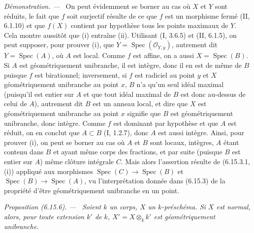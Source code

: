 \documentclass[10pt,oneside]{book}
\newcommand{\oldpage}[2][]{%
  \setcounter{footnote}{0}%
  \marginpar{\scriptsize\textbf{#1}~|~#2}\ignorespaces}
\newenvironment{proposition}[1][]{%
  \par\medskip\noindent\itshape Proposition (#1). ---\ }{\par}
\newenvironment{proof}{%
  \par\medskip\noindent\textit{Démonstration. ---\ }}{\par}
\begin{document}
\begin{proof}
On peut évidemment se borner au cas où $X$ et $Y$ sont réduits, le fait
que $f$ soit surjectif résulte de ce que $f$ est un morphisme fermé (II,
6.1.10) et que $f(X)$ contient par hypothèse tous les points maximaux de
$Y$. Cela montre aussitôt que (i) entraîne (ii). Utilisant (I, 3.6.5) et
(II, 6.1.5), on peut supposer, pour prouver (i), que
$Y=\operatorname{Spec}(\mathcal O_{Y,y})$, autrement dit
$Y=\operatorname{Spec}(A)$, où $A$ est local. Comme $f$ est affine, on a
aussi $X=\operatorname{Spec}(B)$. Si $A$ est géométriquement unibranche,
il est intègre, donc il en est de même de $B$ puisque $f$ est birationnel;
inversement, si $f$ est radiciel au point $y$ et $X$ géométriquement
unibranche au point $x$, $B$ n'a qu'un seul idéal maximal (puisqu'il est
entier sur $A$ et que tout idéal maximal de $B$ est donc au-dessus de celui
de $A$), autrement dit $B$ est un anneau local, et dire que $X$ est
géométriquement unibranche au point $x$ signifie que $B$ est
géométriquement unibranche, donc intègre. Comme $f$ est dominant par
hypothèse et que $A$ est réduit, on en conclut que $A\subset B$ (I,
1.2.7), donc $A$ est aussi intègre. Ainsi, pour prouver (i), on peut se
borner au cas où $A$ et $B$ sont locaux, intègres, $A$ étant contenu dans
$B$ et ayant même corps des fractions, et par suite (puisque $B$ est entier
sur $A$) même clôture intégrale $C$. Mais alors l'assertion résulte de
(6.15.3.1, (i)) appliqué aux morphismes
$\operatorname{Spec}(C)\to\operatorname{Spec}(B)$ et
$\operatorname{Spec}(B)\to\operatorname{Spec}(A)$, vu l'interprétation
donnée dans (6.15.3) de la propriété d'être géométriquement unibranche en
un point.
\end{proof}

\oldpage[IV-2]{179}
\begin{proposition}[6.15.6]
\label{IV.2.s6.15.6-fr}
Soient $k$ un corps, $X$ un $k$-préschéma. Si $X$ est normal, alors, pour
toute extension $k'$ de $k$, $X'=X\otimes_k k'$ est géométriquement
unibranche.
\end{proposition}
\end{document}
